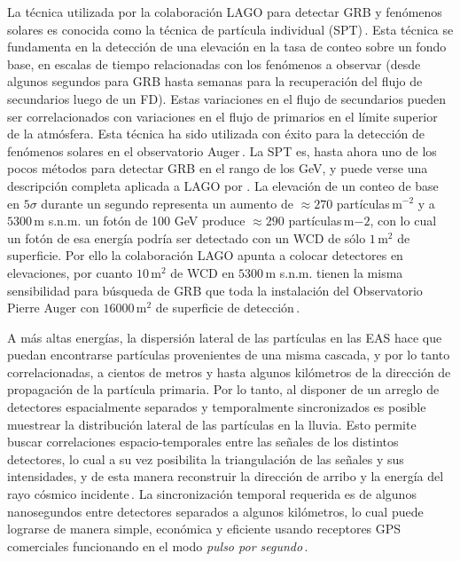 La técnica utilizada por la colaboración LAGO para detectar GRB y fenómenos
solares es conocida como la técnica de partícula individual
(SPT)\,\cite{Vernetto2000}. Esta técnica se fundamenta en la detección de una
elevación en la tasa de conteo sobre un fondo base, en escalas de tiempo
relacionadas con los fenómenos a observar (desde algunos segundos para GRB
hasta semanas para la recuperación del flujo de secundarios luego de un FD).
Estas variaciones en el flujo de secundarios pueden ser correlacionados con
variaciones en el flujo de primarios en el límite superior de la atmósfera.
Esta técnica ha sido utilizada con éxito para la detección de fenómenos solares
en el observatorio Auger\,\cite{ThePierreAugerCollaboration2011,Asorey2011a}.
La SPT es, hasta ahora uno de los pocos métodos para detectar GRB en el rango
de los GeV, y puede verse una descripción completa aplicada a LAGO por
\cite{BertouAllard2005}. La elevación de un conteo de base en $5 \sigma$
durante un segundo representa un aumento de $\approx 270$ partículas\,m$^{-2}$
y a $5300$\,m s.n.m. un fotón de 100 GeV produce $\approx 290$
partículas\,m${-2}$, con lo cual un fotón de esa energía podría ser detectado
con un WCD de sólo $1$\,m$^2$ de superficie\cite{BertouAllard2005}. Por ello la
colaboración LAGO apunta a colocar detectores en elevaciones, por cuanto
$10$\,m$^{2}$ de WCD en $5300$\,m s.n.m. tienen la misma sensibilidad para
búsqueda de GRB que toda la instalación del Observatorio Pierre Auger con
$16000$\,m$^{2}$ de superficie de
detección\,\cite{AllardEtal2009A,AllardEtal2009B}.

A más altas energías, la dispersión lateral de las partículas en las EAS hace
que puedan encontrarse partículas provenientes de una misma cascada, y por lo
tanto correlacionadas, a cientos de metros y hasta algunos kilómetros de la
dirección de propagación de la partícula primaria. Por lo tanto, al disponer de
un arreglo de detectores espacialmente separados y temporalmente sincronizados
es posible muestrear la distribución lateral de las partículas en la lluvia.
Esto permite buscar correlaciones espacio-temporales entre las señales de los
distintos detectores, lo cual a su vez posibilita la triangulación de las
señales y sus intensidades, y de esta manera reconstruir la dirección de arribo
y la energía del rayo cósmico incidente\,\cite{Asorey2005}. La sincronización
temporal requerida es de algunos nanosegundos entre detectores separados a
algunos kilómetros, lo cual puede lograrse de manera simple, económica y
eficiente usando receptores GPS comerciales funcionando en el modo
{\textit{pulso por segundo}}\,\cite{Pryke1995}.


